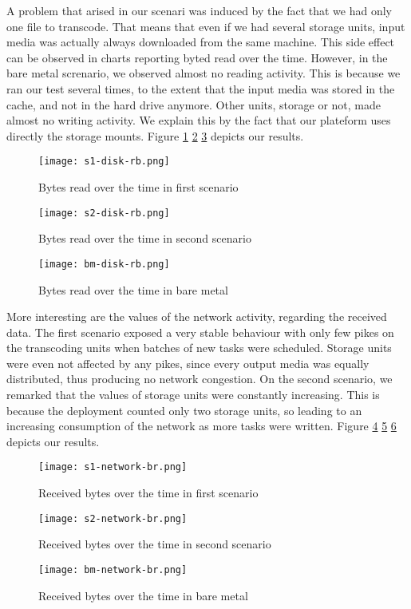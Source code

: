 \documentclass[a4paper, titlepage]{paper}
\numberwithin{figure}{section}
\numberwithin{table}{section}
\begin{document}
        A problem that arised in our scenari was induced by the fact that we had only one file to transcode. That means that even if we had several storage units, input media was actually always downloaded from the same machine. This side effect can be observed in charts reporting byted read over the time. However, in the bare metal screnario, we observed almost no reading activity. This is because we ran our test several times, to the extent that the input media was stored in the cache, and not in the hard drive anymore. Other units, storage or not, made almost no writing activity. We explain this by the fact that our plateform uses directly the storage mounts. Figure \ref{s1dbr} \ref{s2dbr} \ref{bmdbr} depicts our results.
        
        \begin{figure}
          \centering
          \texttt{[image: s1-disk-rb.png]}
          \caption{Bytes read over the time in first scenario}
          \label{s1dbr}
        \end{figure}
        \begin{figure}
          \centering
          \texttt{[image: s2-disk-rb.png]}
          \caption{Bytes read over the time in second scenario}
          \label{s2dbr}
        \end{figure}
        \begin{figure}
          \centering
          \texttt{[image: bm-disk-rb.png]}
          \caption{Bytes read over the time in bare metal}
          \label{bmdbr}
        \end{figure}

        More interesting are the values of the network activity, regarding the received data. The first scenario exposed a very stable behaviour with only few pikes on the transcoding units when batches of new tasks were scheduled. Storage units were even not affected by any pikes, since every output media was equally distributed, thus producing no network congestion. On the second scenario, we remarked that the values of storage units were constantly increasing. This is because the deployment counted only two storage units, so leading to an increasing consumption of the network as more tasks were written. Figure \ref{s1nrb} \ref{s2nrb} \ref{bmnrb} depicts our results.

        \begin{figure}
          \centering
          \texttt{[image: s1-network-br.png]}
          \caption{Received bytes over the time in first scenario}
          \label{s1nrb}
        \end{figure}
        \begin{figure}
          \centering
          \texttt{[image: s2-network-br.png]}
          \caption{Received bytes over the time in second scenario}
          \label{s2nrb}
        \end{figure}
        \begin{figure}
          \centering
          \texttt{[image: bm-network-br.png]}
          \caption{Received bytes over the time in bare metal}
          \label{bmnrb}
        \end{figure}
\end{document}
